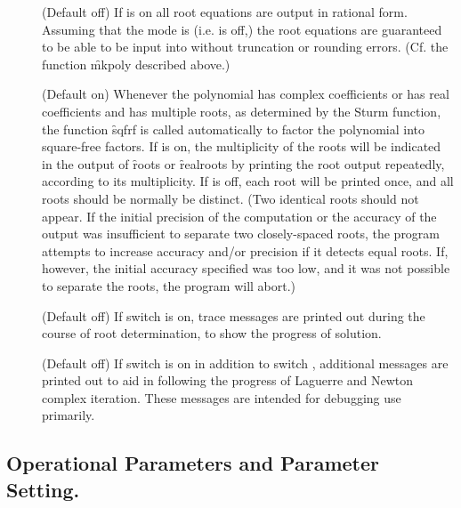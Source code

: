 \begin{description}
\item[]
  \hypertarget{switch:RATROOT}{}
(Default off) If  is on all root equations are
output in rational form.  Assuming that the mode is  (i.e.
 is off,) the root equations are
guaranteed to be able to be input into \REDUCE{} without truncation or
rounding errors. (Cf. the function \f{mkpoly} described above.)

\item[]
  \hypertarget{switch:MULTIROOT}{}
(Default on) Whenever the polynomial has complex
coefficients or has real coefficients and has multiple roots, as
 determined by the Sturm function, the function \f{sqfrf}
is called automatically to factor the polynomial into square-free factors.
If  is on, the multiplicity of the roots will be indicated
in the output of \f{roots} or \f{realroots} by printing the root output
repeatedly, according to its multiplicity.  If  is off,
each root will be printed once, and all roots should be normally be
distinct. (Two identical roots should not appear.  If the initial
precision of the computation or the accuracy of the output was
insufficient to separate two closely-spaced roots, the program attempts to
increase accuracy and/or precision if it detects equal roots.  If,
however, the initial accuracy specified was too low, and it was not
possible to separate the roots, the program will abort.)

\item[]
  \hypertarget{switch:TRROOT}{}
(Default off) If switch  is on, trace messages
are printed out during the course of root determination, to show the
progress of solution.

\item[]
  \hypertarget{switch:ROOTMSG}{}
(Default off) If switch
 is on in addition to switch , additional
messages are printed out to aid in following the progress of Laguerre and
Newton complex iteration.  These messages are intended for debugging use
primarily.


\end{description}


\subsection{Operational Parameters and Parameter Setting.}

